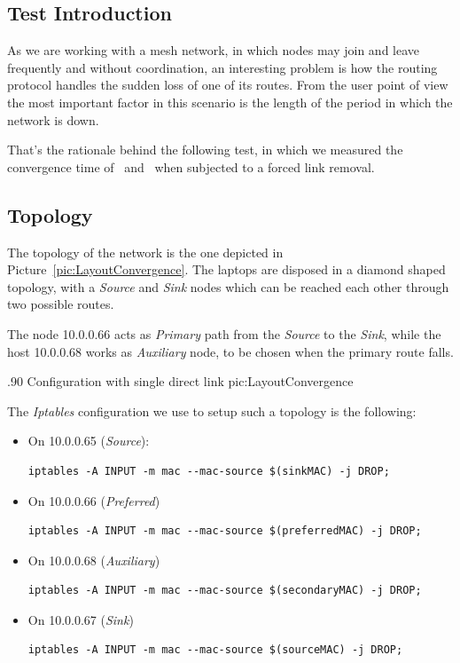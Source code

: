\subsection{Test Introduction}

    As we are working with a mesh network, in which nodes may join
    and leave frequently and without coordination, an interesting problem
    is how the routing protocol handles the sudden loss of one of its
    routes. From the user point of view the most important factor in this
    scenario is the length of the period in which the network is down.

    That's the rationale behind the following test, in which we measured
    the convergence time of \batman\ and \olsr\ when subjected to a forced
    link removal.

\subsection{Topology}

    The topology of the network is the one depicted in
    Picture~\ref{pic:LayoutConvergence}. The laptops are disposed in a
    diamond shaped topology, with a \emph{Source} and \emph{Sink} nodes
    which can be reached each other through two possible routes.

    The node 10.0.0.66 acts as \emph{Primary} path from the \emph{Source}
    to the \emph{Sink}, while the host 10.0.0.68 works as \emph{Auxiliary}
    node, to be chosen when the primary route falls.

            {.90\columnwidth}
            {Configuration with single direct link}
            {pic:LayoutConvergence}

    \noindent The \emph{Iptables} configuration we use to setup such a topology is
    the following:

    \begin{itemize}
    \item On 10.0.0.65 (\emph{Source}):

\begin{verbatim}
iptables -A INPUT -m mac --mac-source $(sinkMAC) -j DROP;
\end{verbatim}

    \item On 10.0.0.66 (\emph{Preferred})
\begin{verbatim}
iptables -A INPUT -m mac --mac-source $(preferredMAC) -j DROP;
\end{verbatim}

    \item On 10.0.0.68 (\emph{Auxiliary})
\begin{verbatim}
iptables -A INPUT -m mac --mac-source $(secondaryMAC) -j DROP;
\end{verbatim}

    \item On 10.0.0.67 (\emph{Sink})
\begin{verbatim}
iptables -A INPUT -m mac --mac-source $(sourceMAC) -j DROP;
\end{verbatim}
\end{itemize}

